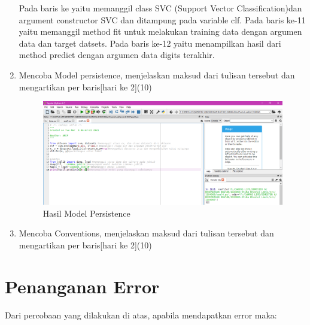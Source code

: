 \begin{enumerate}
\hfill\break
Pada baris ke yaitu memanggil class SVC (Support Vector Classification)dan argument constructor SVC dan ditampung pada variable  clf.
\hfill\break
Pada baris ke-11 yaitu memanggil method fit untuk melakukan training data dengan argumen data dan target datsets.
\hfill\break
Pada baris ke-12 yaitu menampilkan hasil dari method predict dengan argumen data digits terakhir.
\item
Mencoba Model persistence, menjelaskan maksud dari tulisan tersebut dan mengartikan per baris[hari ke 2](10)

\begin{figure}[H]
	\includegraphics[width=1\textwidth]{figures/1184065/soal4.png}
	\centering
	\caption{Hasil Model Persistence}
\end{figure}
\item 
Mencoba Conventions, menjelaskan maksud dari tulisan tersebut dan mengartikan per baris[hari ke 2](10)

\end{enumerate}


\section{Penanganan Error}
Dari percobaan yang dilakukan di atas, apabila mendapatkan error maka:

